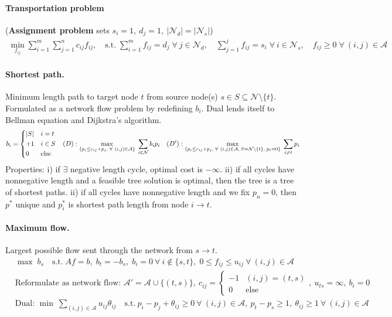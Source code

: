 \documentclass{article}
\begin{document}
\paragraph{Transportation problem} (\textbf{Assignment problem} sets $s_i=1,\ d_j=1,\ |\mathcal N_d| = |\mathcal N_s|$)
{\footnotesize
\begin{align*}
    \min_{f_{ij}} \sum_{i=1}^m\sum_{j=1}^nc_{ij}f_{ij}, \quad \text{s.t.}\; \sum_{i=1}^mf_{ij} = d_j\; \forall\ j\in\mathcal N_d, \quad \sum_{j=1}^jf_{ij} = s_i\; \forall\ i\in\mathcal N_s,\quad f_{ij}\geq 0\;\forall\ (i,j)\in \mathcal A
\end{align*}
}


\paragraph{Shortest path.} Minimum length path to target node $t$ from source node(s) $s\in S\subseteq \mathcal N\setminus\{t\}$. Formulated as a network flow problem by redefining $b_i$. Dual lends itself to Bellman equation and Dijkstra's algorithm.
{\footnotesize
\begin{align*}
    b_i = \begin{cases*}
        |S| & $i=t$\\
        +1 & $i\in S$\\
        0 & else
    \end{cases*}
    && (D): \max_{\{p_i \leq c_{ij} + p_j,\;\forall\ (i,j)\in\mathcal A\}}\; \sum_{i\in \mathcal N}b_ip_i
    &&(D'): \max_{\{p_i \leq c_{ij} + p_j,\;\forall\ (i,j)\in\mathcal A,\:S=\mathcal N\setminus\{t\},\; p_t=0\}}\; \sum_{i\neq t}p_i
\end{align*}
}
Properties: i) if $\exists$ negative length cycle, optimal cost is $-\infty$. ii) if all cycles have nonnegative length and a feasible tree solution is optimal, then the tree is a tree of shortest paths. ii) if all cycles have nonnegative length and we fix $p_n=0$, then $p^*$ unique and $p^*_i$ is shortest path length from node $i\rightarrow t$.

\paragraph{Maximum flow.} Largest possible flow sent through the network from $s\rightarrow t$.
{\footnotesize
\begin{align*}
    &\max\; b_s \quad \text{s.t.}\; Af = b,\; b_t = -b_s,\; b_i = 0\ \forall\ i\notin\{s,t\},\;
    0\leq f_{ij}\leq u_{ij}\ \forall\ (i,j)\in \mathcal A\\
    &\text{Reformulate as network flow: }
    \mathcal A' = \mathcal A\cup\{(t,s)\},\
    c_{ij} = \begin{cases*}
        -1 & \text{$(i,j)=(t,s)$}\\
        0 & \text{else}
    \end{cases*},\ u_{ts} = \infty,\ b_i = 0\\
    &\text{Dual: }\min\ \sum_{(i,j)\in \mathcal A} u_{ij}\theta_{ij}
    \quad\text{s.t.}\ p_i - p_j + \theta_{ij}\geq0\ \forall\ (i,j)\in\mathcal A,\
    p_t - p_s \geq 1,\ \theta_{ij}\geq 1\ \forall\ (i,j)\in\mathcal A
\end{align*}
}
\end{document}
